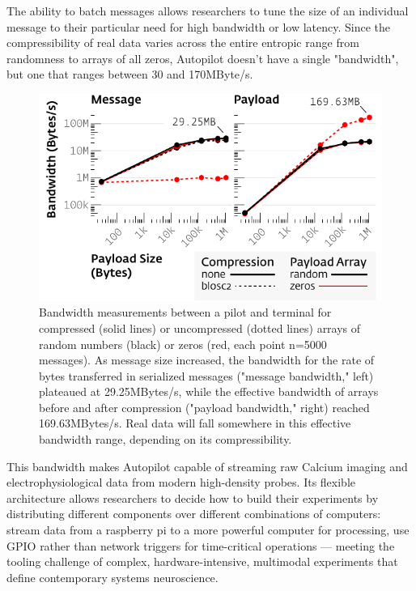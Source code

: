 The ability to batch messages allows researchers to tune the size of an individual message to their particular need for high bandwidth or low latency. Since the compressibility of real data varies across the entire entropic range from randomness to arrays of all zeros, Autopilot doesn't have a single "bandwidth", but one that ranges between 30 and 170MByte/s. %
%
\begin{figure}[t]
\includegraphics[]{figures/networking_bandwidth.pdf}
\caption{Bandwidth measurements between a pilot and terminal for compressed (solid lines) or uncompressed (dotted lines) arrays of random numbers (black) or zeros (red, each point n=5000 messages). As message size increased, the bandwidth for the rate of bytes transferred in serialized messages ("message bandwidth," left) plateaued at 29.25MBytes/s, while the effective bandwidth of arrays before and after compression ("payload bandwidth," right) reached 169.63MBytes/s. Real data will fall somewhere in this effective bandwidth range, depending on its compressibility.}
\label{fig:bandwidth}
\end{figure}%
%
This bandwidth makes Autopilot capable of streaming raw Calcium imaging and electrophysiological data from modern high-density probes. Its flexible architecture allows researchers to decide how to build their experiments by distributing different components over different combinations of computers: stream data from a raspberry pi to a more powerful computer for processing, use GPIO rather than network triggers for time-critical operations --- meeting the tooling challenge of complex, hardware-intensive, multimodal experiments that define contemporary systems neuroscience.